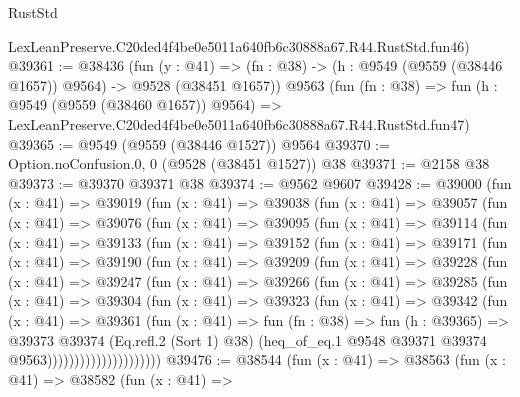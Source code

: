 \begin{lexlean}{RustStd}
\begin{coremodule}
    LexLeanPreserve.C20ded4f4be0e5011a640fb6c30888a67.R44.RustStd.fun46)
@39361 := @38436
    (fun (y : @41) =>
    (fn : @38) -> (h : @9549 (@9559 (@38446 @1657)) @9564) -> @9528 (@38451 @1657))
    @9563
    (fun (fn : @38) =>
    fun (h : @9549 (@9559 (@38460 @1657)) @9564) =>
    LexLeanPreserve.C20ded4f4be0e5011a640fb6c30888a67.R44.RustStd.fun47)
@39365 := @9549 (@9559 (@38446 @1527)) @9564
@39370 := Option.noConfusion.{0, 0} (@9528 (@38451 @1527)) @38
@39371 := @2158 @38
@39373 := @39370 @39371 @38
@39374 := @9562 @9607
@39428 := @39000
    (fun (x : @41) =>
    @39019
      (fun (x : @41) =>
      @39038
        (fun (x : @41) =>
        @39057
          (fun (x : @41) =>
          @39076
            (fun (x : @41) =>
            @39095
              (fun (x : @41) =>
              @39114
                (fun (x : @41) =>
                @39133
                  (fun (x : @41) =>
                  @39152
                    (fun (x : @41) =>
                    @39171
                      (fun (x : @41) =>
                      @39190
                        (fun (x : @41) =>
                        @39209
                          (fun (x : @41) =>
                          @39228
                            (fun (x : @41) =>
                            @39247
                              (fun (x : @41) =>
                              @39266
                                (fun (x : @41) =>
                                @39285
                                  (fun (x : @41) =>
                                  @39304
                                    (fun (x : @41) =>
                                    @39323
                                      (fun (x : @41) =>
                                      @39342
                                        (fun (x : @41) =>
                                        @39361
                                          (fun (x : @41) =>
                                          fun (fn : @38) =>
                                          fun (h : @39365) =>
                                          @39373
                                            @39374
                                            (Eq.refl.{2} (Sort 1) @38)
                                            (heq_of_eq.{1}
                                              @9548
                                              @39371
                                              @39374
                                              @9563)))))))))))))))))))))
@39476 := @38544
    (fun (x : @41) =>
    @38563
      (fun (x : @41) =>
      @38582
        (fun (x : @41) =>

\end{coremodule}
\end{lexlean}
